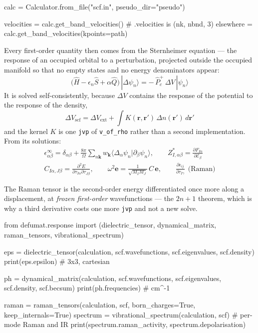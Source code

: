 \documentclass[11pt,a4paper]{article}
\newcommand{\code}[1]{\texttt{\small #1}}
\begin{document}
\begin{pycode}
calc = Calculator.from_file("scf.in", pseudo_dir="pseudo")

velocities = calc.get_band_velocities()          # .velocities is (nk, nbnd, 3)
elsewhere = calc.get_band_velocities(kpoints=path)
\end{pycode}

Every first-order quantity then comes from the Sternheimer equation --- the response
of an occupied orbital to a perturbation, projected outside the occupied
manifold so that no empty states and no energy denominators appear:
\begin{equation*}
\big(\hat H - \epsilon_n\hat S + \alpha\hat Q\big)\,|\Delta\psi_n\rangle
  = -\,\hat P_c^{+}\,\Delta V\,|\psi_n\rangle
\end{equation*}
It is solved self-consistently, because $\Delta V$ contains the response of the
potential to the response of the density,
\begin{equation*}
\Delta V_{\mathrm{scf}} = \Delta V_{\mathrm{ext}}
  + \int K(\mathbf r,\mathbf r')\,\Delta n(\mathbf r')\,d\mathbf r'
\end{equation*}
and the kernel $K$ is one \code{jvp} of \code{v\_of\_rho} rather than a second
implementation. From its solutions:
\begin{gather*}
\epsilon^\infty_{\alpha\beta} = \delta_{\alpha\beta}
  + \frac{8\pi}{\Omega}\sum_{n\mathbf k} w_{\mathbf k}
    \langle\Delta_\alpha\psi_n|\partial_\beta\psi_n\rangle,
\qquad
Z^{\ast}_{I,\alpha\beta} = \frac{\partial F_{I\alpha}}{\partial\mathcal E_\beta} \\[3pt]
C_{I\alpha,J\beta} = \frac{\partial^2 E}{\partial\tau_{I\alpha}\partial\tau_{J\beta}},
\qquad
\omega^2\mathbf e = \frac{1}{\sqrt{M_I M_J}}\,C\,\mathbf e,
\qquad
\frac{\partial\epsilon_{ij}}{\partial\tau_{I\gamma}}\ \ \text{(Raman)}
\end{gather*}

The Raman tensor is the second-order energy differentiated once more along a
displacement, at \emph{frozen first-order} wavefunctions --- the $2n{+}1$
theorem, which is why a third derivative costs one more \code{jvp} and not a new
solve.

\begin{pycode}
from defumat.response import (dielectric_tensor, dynamical_matrix,
                               raman_tensors, vibrational_spectrum)

eps = dielectric_tensor(calculation, scf.wavefunctions, scf.eigenvalues,
                        scf.density)
print(eps.epsilon)                     # 3x3, cartesian

ph = dynamical_matrix(calculation, scf.wavefunctions, scf.eigenvalues,
                      scf.density, scf.becsum)
print(ph.frequencies)                  # cm^-1

raman = raman_tensors(calculation, scf, born_charges=True, keep_internals=True)
spectrum = vibrational_spectrum(calculation, scf)   # per-mode Raman and IR
print(spectrum.raman_activity, spectrum.depolarisation)
\end{pycode}
\end{document}
